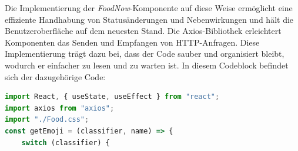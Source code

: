 Die Implementierung der \emph{FoodNow}-Komponente auf diese Weise ermöglicht eine effiziente Handhabung von Statusänderungen und Nebenwirkungen und hält die Benutzeroberfläche auf dem neuesten Stand. Die Axios-Bibliothek erleichtert Komponenten das Senden und Empfangen von HTTP-Anfragen. Diese Implementierung trägt dazu bei, dass der Code sauber und organisiert bleibt, wodurch er einfacher zu lesen und zu warten ist.
In diesem Codeblock befindet sich der dazugehörige Code:
\begin{lstlisting}[language=JavaScript,
	frame=single,           % Ein Rahmen um den Code
	framexleftmargin=15pt,  % Rahmen link von den Zahlen
	style=algoBericht,
	label={FoodNow-Komponente},
	captionpos=b ,          % Caption unter den Code setzen
	caption={FoodNow-Komponente}]
import React, { useState, useEffect } from "react";
import axios from "axios";
import "./Food.css";
const getEmoji = (classifier, name) => {
	switch (classifier) {
		

\end{lstlisting}
